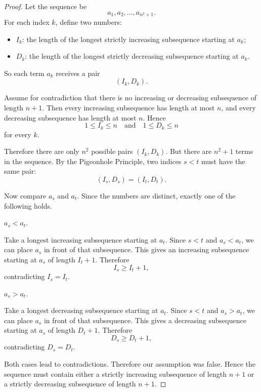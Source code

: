 \documentclass{article}
\begin{document}
\begin{proof}
Let the sequence be
\[
    a_1,a_2,\dots,a_{n^2+1}.
\]
For each index $k$, define two numbers:
\begin{itemize}
    \item $I_k$: the length of the longest strictly increasing subsequence starting at $a_k$;
    \item $D_k$: the length of the longest strictly decreasing subsequence starting at $a_k$.
\end{itemize}
So each term $a_k$ receives a pair
\[
    (I_k,D_k).
\]

Assume for contradiction that there is no increasing or decreasing subsequence of length $n+1$. Then every increasing subsequence has length at most $n$, and every decreasing subsequence has length at most $n$. Hence
\[
    1\le I_k\le n
    \quad\text{and}\quad
    1\le D_k\le n
\]
for every $k$.

Therefore there are only $n^2$ possible pairs $(I_k,D_k)$. But there are $n^2+1$ terms in the sequence. By the Pigeonhole Principle, two indices $s<t$ must have the same pair:
\[
    (I_s,D_s)=(I_t,D_t).
\]

Now compare $a_s$ and $a_t$. Since the numbers are distinct, exactly one of the following holds.

\begin{Cases}
    \item $a_s<a_t$.

    Take a longest increasing subsequence starting at $a_t$. Since $s<t$ and $a_s<a_t$, we can place $a_s$ in front of that subsequence. This gives an increasing subsequence starting at $a_s$ of length $I_t+1$. Therefore
    \[
        I_s\ge I_t+1,
    \]
    contradicting $I_s=I_t$.

    \item $a_s>a_t$.

    Take a longest decreasing subsequence starting at $a_t$. Since $s<t$ and $a_s>a_t$, we can place $a_s$ in front of that subsequence. This gives a decreasing subsequence starting at $a_s$ of length $D_t+1$. Therefore
    \[
        D_s\ge D_t+1,
    \]
    contradicting $D_s=D_t$.
\end{Cases}

Both cases lead to contradictions. Therefore our assumption was false. Hence the sequence must contain either a strictly increasing subsequence of length $n+1$ or a strictly decreasing subsequence of length $n+1$.
\end{proof}
\end{document}
